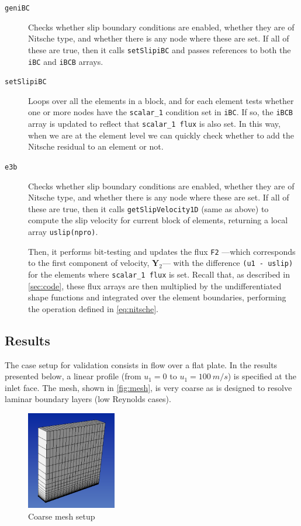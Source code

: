\documentclass{ucb}
\begin{document}
\begin{description}

    \item[\texttt{geniBC}] Checks whether slip boundary conditions are enabled, whether they are of Nitsche type, and whether there is any node where these are set. If all of these are true, then it calls \texttt{setSlipiBC} and passes references to both the \texttt{iBC} and \texttt{iBCB} arrays.
    
    \item[\texttt{setSlipiBC}] Loops over all the elements in a block, and for each element tests whether one or more nodes have the \texttt{scalar\_1} condition set in \texttt{iBC}. If so, the \texttt{iBCB} array is updated to reflect that \texttt{scalar\_1 flux} is also set. In this way, when we are at the element level we can quickly check whether to add the Nitsche residual to an element or not.
    
    \item[\texttt{e3b}] Checks whether slip boundary conditions are enabled, whether they are of Nitsche type, and whether there is any node where these are set. If all of these are true, then it calls \texttt{getSlipVelocity1D} (same as above) to compute the slip velocity for current block of elements, returning a local array \texttt{uslip(npro)}.
    
    Then, it performs bit-testing and updates the flux \texttt{F2} ---which corresponds to the first component of velocity, $\bm{Y}_2$--- with the difference \texttt{(u1 - uslip)} for the elements where \texttt{scalar\_1 flux} is set. Recall that, as described in \autoref{sec:code}, these flux arrays are then multiplied by the undifferentiated shape functions and integrated over the element boundaries, performing the operation defined in \autoref{eq:nitsche}.

\end{description}

\subsection{Results}

The case setup for validation consists in flow over a flat plate. In the results presented below, a linear profile (from $u_1 = 0$ to $u_1 = \SI{100}{m/s}$) is specified at the inlet face. The mesh, shown in \autoref{fig:mesh}, is very coarse as is designed to resolve laminar boundary layers (low Reynolds cases).

\begin{figure}[H]
    \centering
    \includegraphics[width = 0.35\textwidth]{img/mesh.png}
    \caption{Coarse mesh setup}
    \label{fig:mesh}
\end{figure}
\end{document}
